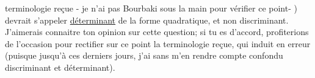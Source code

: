 
terminologie reçue  - je n'ai pas Bourbaki sous la main pour vérifier ce
point- ) devrait s'appeler \uline{déterminant} de la forme quadratique, et non
discriminant. J'aimerais connaitre ton opinion sur cette question; si
tu es d'accord,  profiterions de l'occasion pour rectifier sur ce
point la terminologie reçue, qui induit en erreur (puisque jusqu'à ces
derniers jours, j'ai sans m'en rendre compte confondu discriminant et
déterminant).

